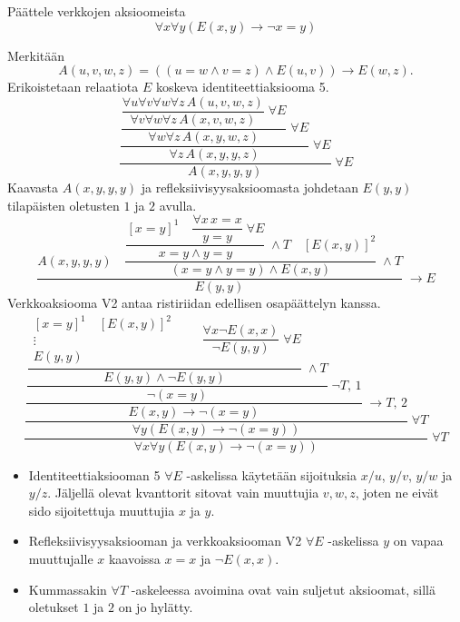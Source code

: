 \documentclass[11pt,a4paper]{amsart}
\begin{document}
\begin{samepage}
  \begin{exercise}
    Päättele verkkojen aksioomeista
    \[
      \forall x\forall y(E(x,y) \to \neg x = y)
    \]
  \end{exercise}

  \begin{solution}
    Merkitään
    \[
      A(u,v,w,z)=((u=w\land v=z)\land E(u,v))\to E(w,z).
    \]
    Erikoistetaan relaatiota \(E\) koskeva identiteettiaksiooma 5.
    \[
      \dfrac{
        \dfrac{
          \dfrac{
            \dfrac{\forall u\forall v\forall w\forall z\,A(u,v,w,z)}
            {\forall v\forall w\forall z\,A(x,v,w,z)}\;\forall E
          }{\forall w\forall z\,A(x,y,w,z)}\;\forall E
        }{\forall z\,A(x,y,y,z)}\;\forall E
      }{A(x,y,y,y)}\;\forall E
    \]
    Kaavasta \(A(x,y,y,y)\) ja refleksiivisyysaksioomasta johdetaan
    \(E(y,y)\) tilapäisten oletusten \(1\) ja \(2\) avulla.
    \[
      \dfrac{
        A(x,y,y,y)
        \quad
        \dfrac{
          \dfrac{[x=y]^1\quad\dfrac{\forall x\, x=x}{y=y}\;\forall E}
          {x=y\land y=y}\;\land T
          \quad [E(x,y)]^2
        }{(x=y\land y=y)\land E(x,y)}\;\land T
      }{E(y,y)}\;\to E
    \]
    Verkkoaksiooma V2 antaa ristiriidan edellisen osapäättelyn kanssa.
    \[
      \dfrac{
        \dfrac{
          \dfrac{
            \dfrac{
              \dfrac{
                \begin{gathered}
                  [x=y]^1\quad [E(x,y)]^2 \\
                  \vdots \\
                  E(y,y)
                \end{gathered}
                \qquad
                \dfrac{\forall x\neg E(x,x)}{\neg E(y,y)}\;\forall E
              }{E(y,y)\land\neg E(y,y)}\;\land T
            }{\neg(x=y)}\;\neg T,\,1
          }{E(x,y)\to\neg(x=y)}\;\to T,\,2
        }{\forall y(E(x,y)\to\neg(x=y))}\;\forall T
      }{\forall x\forall y(E(x,y)\to\neg(x=y))}\;\forall T
    \]
    \begin{itemize}
      \item Identiteettiaksiooman 5 \(\forall E\) -askelissa käytetään
        sijoituksia \(x/u\), \(y/v\), \(y/w\) ja \(y/z\).
        Jäljellä olevat kvanttorit sitovat vain muuttujia \(v,w,z\),
        joten ne eivät sido sijoitettuja muuttujia \(x\) ja \(y\).
      \item Refleksiivisyysaksiooman ja verkkoaksiooman V2 \(\forall E\)
        -askelissa \(y\) on vapaa muuttujalle \(x\) kaavoissa
        \(x=x\) ja \(\neg E(x,x)\).
      \item Kummassakin \(\forall T\) -askeleessa avoimina ovat vain
        suljetut aksioomat, sillä oletukset \(1\) ja \(2\) on jo
        hylätty.\qedhere
    \end{itemize}
  \end{solution}
\end{samepage}
\end{document}
